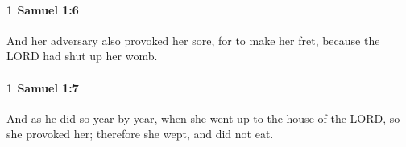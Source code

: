 		\paragraph{1 Samuel 1:6} %
			\label{1SAMUEL-1-6}

			And her adversary also provoked her sore, for to make her fret, because the LORD had shut up her womb.


		\paragraph{1 Samuel 1:7} %
			\label{1SAMUEL-1-7}

			And as he did so year by year, when she went up to the house of the LORD, so she provoked her; therefore she wept, and did not eat.


